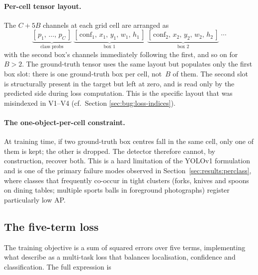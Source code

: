 \paragraph{Per-cell tensor layout.} The $C + 5B$ channels at each grid cell
are arranged as
\[
  \underbrace{[\,p_1,\,\ldots,\,p_{C}\,]}_{\text{class probs}}\;
  \underbrace{[\,\text{conf}_1,\,x_1,\,y_1,\,w_1,\,h_1\,]}_{\text{box 1}}\;
  \underbrace{[\,\text{conf}_2,\,x_2,\,y_2,\,w_2,\,h_2\,]}_{\text{box 2}}\;\cdots
\]
with the second box's channels immediately following the first, and so on
for $B > 2$. The ground-truth tensor uses the same layout but populates only
the first box slot: there is one ground-truth box per cell, not~$B$ of them.
The second slot is structurally present in the target but left at zero, and
is read only by the predicted side during loss computation. This is the
specific layout that was misindexed in V1--V4 (cf.\ Section
\ref{sec:bug:loss-indices}).

\paragraph{The one-object-per-cell constraint.} At training time, if two
ground-truth box centres fall in the same cell, only one of them is kept; the
other is dropped. The detector therefore cannot, by construction, recover
both. This is a hard limitation of the YOLOv1 formulation and is one of the
primary failure modes observed in Section~\ref{sec:results:perclass}, where
classes that frequently co-occur in tight clusters (forks, knives and spoons
on dining tables; multiple sports balls in foreground photographs) register
particularly low AP.

\subsection{The five-term loss}
\label{sec:theory:loss}

The training objective is a sum of squared errors over five terms,
implementing what \citet{redmon2016you} describe as a multi-task loss that
balances localisation, confidence and classification. The full expression is

